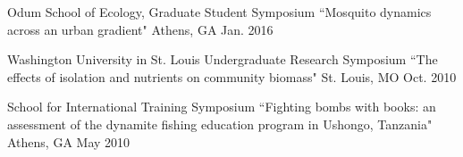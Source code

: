 

\begin{cvsubentries}

  \cvsubentry
    {Odum School of Ecology, Graduate Student Symposium} %
    {``Mosquito dynamics across an urban gradient"} %
    {Athens, GA} %
    {Jan. 2016} %
    {
      \begin{cvitems} %
      \end{cvitems}
    }

  \cvsubentry
    {Washington University in St. Louis Undergraduate Research Symposium} %
    {``The effects of isolation and nutrients on community biomass"} %
    {St. Louis, MO} %
    {Oct. 2010} %
    {
      \begin{cvitems} %
      \end{cvitems}
    }

  \cvsubentry
    {School for International Training Symposium} %
    {``Fighting bombs with books: an assessment of the dynamite fishing education program in Ushongo, Tanzania"} %
    {Athens, GA} %
    {May 2010} %
	{
      \begin{cvitems} %
      \end{cvitems}
    }
\end{cvsubentries}
